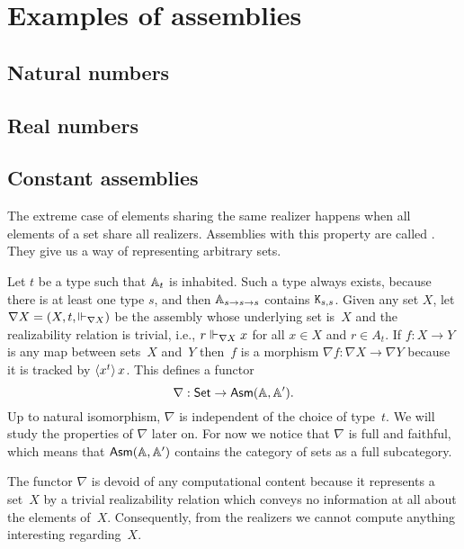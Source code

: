 \section{Examples of assemblies}
\label{sec:examples-assemblies}


\subsection{Natural numbers}
\label{sec:asm-natural-numbers}


\subsection{Real numbers}
\label{sec:asm-real-numbers}


\subsection{Constant assemblies}
\label{sec:nabla}

The extreme case of elements sharing the same realizer happens when
all elements of a set share all realizers. Assemblies with this
property are called . They give us a way of
representing arbitrary sets.

Let $t$ be a type such that ${\mathbb{A}}_{t}$ is inhabited. Such a type
always exists, because there is at least one type $s$, and then
${\mathbb{A}}_{s \to s \to s}$ contains $\mathtt{K}_{s,s}$. Given any set $X$, let
$\nabla X = (X, t, {\Vdash_{\nabla X}})$ be the assembly whose underlying
set is~$X$ and the realizability relation is trivial, i.e., $r
\Vdash_{\nabla X} x$ for all $x \in X$ and $r \in A_t$. If $f : X \to Y$
is any map between sets~$X$ and~$Y$ then~$f$ is a morphism $\nabla f :
\nabla X \to \nabla Y$ because it is tracked by
$\langle x^{t} \rangle\,{x}$. This defines a functor
%
\begin{equation*}
  \nabla : \mathsf{Set} \to \mathsf{Asm}(\mathbb{A},\mathbb{A}').
\end{equation*}
%
Up to natural isomorphism, $\nabla$ is independent of the choice of
type~$t$. We will study the properties of $\nabla$ later on. For now
we notice that $\nabla$ is full and faithful, which means that
$\mathsf{Asm}(\mathbb{A},\mathbb{A}')$ contains the category of sets as a full
subcategory.

The functor $\nabla$ is devoid of any computational content because it
represents a set~$X$ by a trivial realizability relation which conveys
no information at all about the elements of~$X$. Consequently, from
the realizers we cannot compute anything interesting regarding~$X$.

